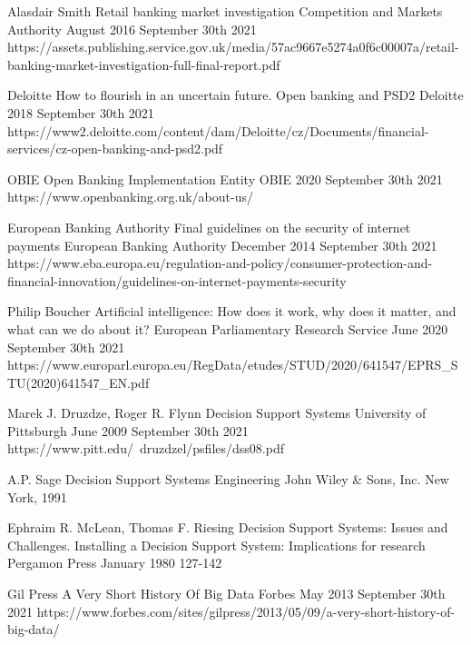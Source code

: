 \begin{thebibliography}{100}
{Alasdair Smith}
{Retail banking market investigation}
{Competition and Markets Authority}
{August 2016}
{September 30th 2021}
{https://assets.publishing.service.gov.uk/media/57ac9667e5274a0f6c00007a/retail-banking-market-investigation-full-final-report.pdf}

{Deloitte}
{How to flourish in an uncertain future. Open banking and PSD2}
{Deloitte}
{2018}
{September 30th 2021}
{https://www2.deloitte.com/content/dam/Deloitte/cz/Documents/financial-services/cz-open-banking-and-psd2.pdf}

{OBIE}
{Open Banking Implementation Entity}
{OBIE}
{2020}
{September 30th 2021}
{https://www.openbanking.org.uk/about-us/}

{European Banking Authority}
{Final guidelines on the security of internet payments}
{European Banking Authority}
{December 2014}
{September 30th 2021}
{https://www.eba.europa.eu/regulation-and-policy/consumer-protection-and-financial-innovation/guidelines-on-internet-payments-security}

{Philip Boucher}
{Artificial intelligence: How does it work, why does it matter, and what can we do about it?}
{European Parliamentary Research Service}
{June 2020}
{September 30th 2021}
{https://www.europarl.europa.eu/RegData/etudes/STUD/2020/641547/EPRS\_STU(2020)641547\_EN.pdf}

{Marek J. Druzdze, Roger R. Flynn}
{Decision Support Systems}
{University of Pittsburgh}
{June 2009}
{September 30th 2021}
{https://www.pitt.edu/~druzdzel/psfiles/dss08.pdf}

{A.P. Sage}
{Decision Support Systems Engineering}
{John Wiley \& Sons, Inc.}
{New York, 1991}
{}

{Ephraim R. McLean, Thomas F. Riesing}
{Decision Support Systems: Issues and Challenges. Installing a Decision Support System: Implications for research}
{Pergamon Press}
{January 1980}
{127-142}

{Gil Press}
{A Very Short History Of Big Data}
{Forbes}
{May 2013}
{September 30th 2021}
{https://www.forbes.com/sites/gilpress/2013/05/09/a-very-short-history-of-big-data/}


\end{thebibliography}

